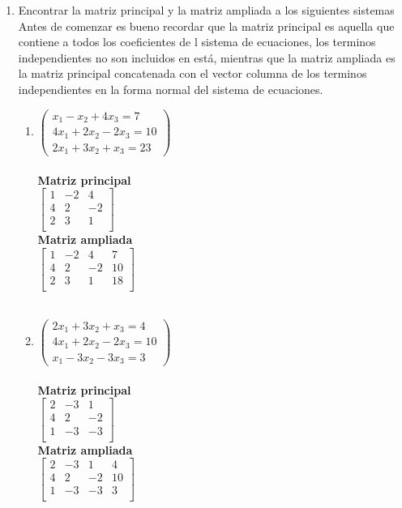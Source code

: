 \documentclass[12pt]{article}
\begin{document}
\begin{enumerate}
	\item Encontrar la matriz principal y la matriz ampliada a los siguientes sistemas \\ Antes de comenzar es bueno recordar que la matriz principal es aquella que contiene a todos los coeficientes de l sistema de ecuaciones, los terminos independientes no son incluidos en est\'a, mientras que la matriz ampliada es la matriz principal concatenada con el vector columna de los terminos independientes en la forma normal del sistema de ecuaciones.
	
	\begin{multicols}{2}\begin{enumerate}
		\item $\begin{pmatrix}
				 x_1 - x_2 +4x_3 =  7 \\
				4x_1 +2x_2 -2x_3 = 10 \\
				2x_1 +3x_2 + x_3 = 23
			\end {pmatrix}$
			\\\ \\ \bf Matriz principal \\
			$\begin{bmatrix}
				1 &-2 & 4 \\
				4 & 2 &-2 \\
				2 & 3 & 1 \\
			\end{bmatrix}$
			\\ \bf Matriz ampliada \\
			$\begin{bmatrix}
				1 &-2 & 4 &  7\\
				4 & 2 &-2 & 10\\
				2 & 3 & 1 & 18\\
			\end{bmatrix}$\\\ \\
			
		\item $\begin{pmatrix}
				2x_1 + 3x_2 + x_3 = 4 \\
				4x_1 + 2x_2 -2x_3 =10 \\
				 x_1 - 3x_2 -3x_3 = 3
			\end {pmatrix}$
			\\\ \\ \bf Matriz principal \\
			$\begin{bmatrix}
				2 &-3 & 1 \\
				4 & 2 &-2 \\
				1 &-3 &-3 \\
			\end{bmatrix}$
			\\ \bf Matriz ampliada \\
			$\begin{bmatrix}
				2 &-3 & 1 & 4\\
				4 & 2 &-2 &10\\
				1 &-3 &-3 & 3\\
			\end{bmatrix}$\\\ \\
			

\end{enumerate}
\end{multicols}
\end{enumerate}
\end{document}
